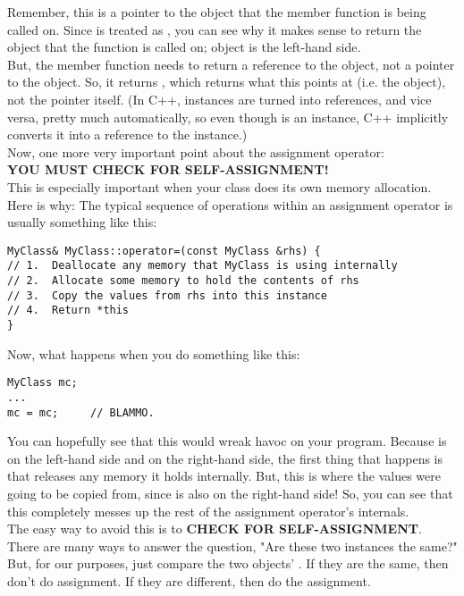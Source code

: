 Remember, this is a pointer to the object that the member function is being called on. Since  is treated as , you can see why it makes sense to return the object that the function is called on; object  is the left-hand side.\\
But, the member function needs to return a reference to the object, not a pointer to the object. So, it returns , which returns what this points at (i.e. the object), not the pointer itself. (In C++, instances are turned into references, and vice versa, pretty much automatically, so even though  is an instance, C++ implicitly converts it into a reference to the instance.)\\

Now, one more very important point about the assignment operator:\\

\textbf{YOU MUST CHECK FOR SELF-ASSIGNMENT!}\\

This is especially important when your class does its own memory allocation. Here is why: The typical sequence of operations within an assignment operator is usually something like this:

\begin{verbatim}
MyClass& MyClass::operator=(const MyClass &rhs) {
// 1.  Deallocate any memory that MyClass is using internally
// 2.  Allocate some memory to hold the contents of rhs
// 3.  Copy the values from rhs into this instance
// 4.  Return *this
}
\end{verbatim}

Now, what happens when you do something like this:

\begin{verbatim}
MyClass mc;
...
mc = mc;     // BLAMMO.
\end{verbatim}

You can hopefully see that this would wreak havoc on your program. Because  is on the left-hand side and on the right-hand side, the first thing that happens is that  releases any memory it holds internally. But, this is where the values were going to be copied from, since  is also on the right-hand side! So, you can see that this completely messes up the rest of the assignment operator's internals.\\

The easy way to avoid this is to \textbf{CHECK FOR SELF-ASSIGNMENT}. There are many ways to answer the question, "Are these two instances the same?" But, for our purposes, just compare the two objects' . If they are the same, then don't do assignment. If they are different, then do the assignment.\\

